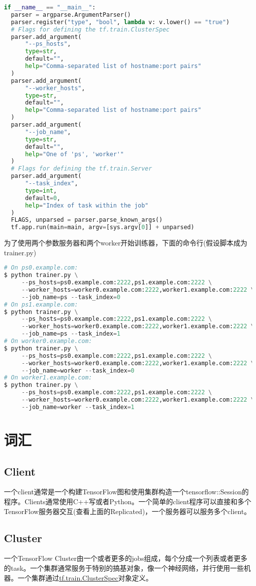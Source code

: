 \begin{lstlisting}[language=Python]
if __name__ == "__main__":
  parser = argparse.ArgumentParser()
  parser.register("type", "bool", lambda v: v.lower() == "true")
  # Flags for defining the tf.train.ClusterSpec
  parser.add_argument(
      "--ps_hosts",
      type=str,
      default="",
      help="Comma-separated list of hostname:port pairs"
  )
  parser.add_argument(
      "--worker_hosts",
      type=str,
      default="",
      help="Comma-separated list of hostname:port pairs"
  )
  parser.add_argument(
      "--job_name",
      type=str,
      default="",
      help="One of 'ps', 'worker'"
  )
  # Flags for defining the tf.train.Server
  parser.add_argument(
      "--task_index",
      type=int,
      default=0,
      help="Index of task within the job"
  )
  FLAGS, unparsed = parser.parse_known_args()
  tf.app.run(main=main, argv=[sys.argv[0]] + unparsed)
\end{lstlisting}
为了使用两个参数服务器和两个worker开始训练器，下面的命令行(假设脚本成为trainer.py)
\begin{lstlisting}[language=Python]
# On ps0.example.com:
$ python trainer.py \
     --ps_hosts=ps0.example.com:2222,ps1.example.com:2222 \
     --worker_hosts=worker0.example.com:2222,worker1.example.com:2222 \
     --job_name=ps --task_index=0
# On ps1.example.com:
$ python trainer.py \
     --ps_hosts=ps0.example.com:2222,ps1.example.com:2222 \
     --worker_hosts=worker0.example.com:2222,worker1.example.com:2222 \
     --job_name=ps --task_index=1
# On worker0.example.com:
$ python trainer.py \
     --ps_hosts=ps0.example.com:2222,ps1.example.com:2222 \
     --worker_hosts=worker0.example.com:2222,worker1.example.com:2222 \
     --job_name=worker --task_index=0
# On worker1.example.com:
$ python trainer.py \
     --ps_hosts=ps0.example.com:2222,ps1.example.com:2222 \
     --worker_hosts=worker0.example.com:2222,worker1.example.com:2222 \
     --job_name=worker --task_index=1
\end{lstlisting}
\section{词汇}
\subsection{Client}
一个client通常是一个构建TensorFlow图和使用集群构造一个tensorflow::Session的程序。Clients通常使用C++写或者Python。一个简单的client程序可以直接和多个TensorFlow服务器交互(查看上面的Replicated)，一个服务器可以服务多个client。
\subsection{Cluster}
一个TensorFlow Cluster由一个或者更多的jobs组成，每个分成一个列表或者更多的task。一个集群通常服务于特别的搞基对象，像一个神经网络，并行使用一些机器。一个集群通过\href{https://www.tensorflow.org/api_docs/python/tf/train/ClusterSpec}{tf.train.ClusterSpec}对象定义。
